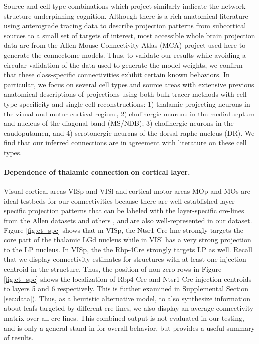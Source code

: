 Source and cell-type combinations which project similarly indicate the network structure underpinning cognition.
Although there is a rich anatomical literature using anterograde tracing data to describe projection patterns from subcortical sources to a small set of targets of interest, most accessible whole brain projection data are from the Allen Mouse Connectivity Atlas (MCA) project used here to generate the connectome models.
Thus, to validate our results while avoiding a circular validation of the data used to generate the model weights, we confirm that these class-specific connectivities exhibit certain known behaviors.
In particular, we focus on several cell types and source areas with extensive previous anatomical descriptions of projections using both bulk tracer methods with cell type specificity and single cell reconstructions: 1) thalamic-projecting neurons in the visual and motor cortical regions, 2) cholinergic neurons in the medial septum and nucleus of the diagonal band (MS/NDB); 3) cholinergic neurons in the caudoputamen, and 4) serotonergic neurons of the dorsal raphe nucleus (DR).
We find that our inferred connections are in agreement with literature on these cell types.

\paragraph{Dependence of thalamic connection on cortical layer.}

Visual cortical areas VISp and VISl and cortical motor areas MOp and MOs are ideal testbeds for our connectivities because there are well-established layer-specific projection patterns that can be labeled with the layer-specific cre-lines from the Allen datasets and others \citet{Jeong2016-dc, Harris2019-mr}, and are also well-represented in our dataset.
Figure \ref{fig:ct_spc} shows that in VISp, the Ntsr1-Cre line strongly targets the core part of the thalamic LGd nucleus while in VISl has a very strong projection to the LP nucleus. In VISp, the the Rbp-4Cre strongly targets LP as well.  
Recall that we display connectivity estimates for structures with at least one injection centroid in the structure.
Thus, the position of non-zero rows in Figure \ref{fig:ct_spc} shows the localization of Rbp4-Cre and Ntsr1-Cre injection centroids to layers 5 and 6 respectively.
This is further examined in Supplemental Section \ref{sec:data}).
Thus, as a heuristic alternative model, to also synthesize information about leafs targeted by different cre-lines, we also display an average connectivity matrix over all cre-lines.
This combined output is not evaluated in our testing, and is only a general stand-in for overall behavior, but provides a useful summary of results.

